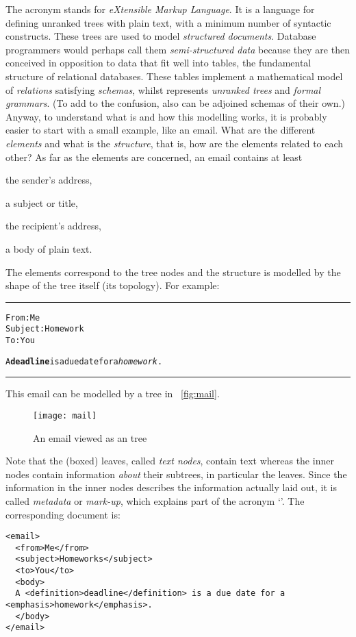 \mypar{\XML}

The acronym \XML stands for \emph{eXtensible Markup Language}. It is a
language for defining unranked trees with plain text, with a minimum
number of syntactic constructs. These trees are used to model
\emph{structured documents}. Database programmers would perhaps call
them \emph{semi\hyp{}structured data} because they are then conceived
in opposition to data that fit well into tables, the fundamental
structure of relational databases. These tables implement a
mathematical model of \emph{relations} satisfying \emph{schemas},
whilst \XML represents \emph{unranked trees} and \emph{formal
  grammars}. (To add to the confusion, \XML also can be adjoined
schemas of their own.)  Anyway, to understand what \XML is and how
this modelling works, it is probably easier to start with a small
example, like an email.  What are the different \emph{elements} and
what is the \emph{structure}, that is, how are the elements related to
each other? As far as the elements are concerned, an email contains at
least
\begin{itemize*}

  \item the sender's address,

  \item a subject or title,

  \item the recipient's address,

  \item a body of plain text.

\end{itemize*}
The elements correspond to the tree nodes and the structure is modelled
by the shape of the tree itself (its topology). For example:

\noindent\rule{\linewidth}{0.5pt}
\begin{alltt}
From: Me
Subject: Homework
To: You

  A \textbf{deadline} is a due date for a \emph{homework}.
\end{alltt}
\rule{\linewidth}{0.5pt}
\medskip
This email can be modelled by a tree in \fig~\vref{fig:mail}.
\begin{figure}
\centering
\texttt{[image: mail]}
\caption{An email viewed as an \XML tree}
\label{fig:mail}
\end{figure}
Note that the (boxed) leaves, called \emph{text nodes}, contain text
whereas the inner nodes contain information \emph{about} their
subtrees, in particular the leaves. Since the information in the inner
nodes describes the information actually laid out, it is called
\emph{metadata} or \emph{mark\hyp{}up}, which explains part of the
acronym `\XML'. The corresponding \XML document is:
\begin{verbatim}
<email>
  <from>Me</from>
  <subject>Homeworks</subject>
  <to>You</to>
  <body>
  A <definition>deadline</definition> is a due date for a
<emphasis>homework</emphasis>.
  </body>
</email>
\end{verbatim}

